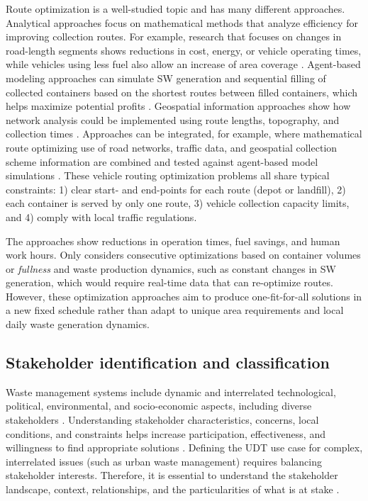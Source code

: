 \documentclass[authoryear,preprint,review,doubleblind, 12pt]{elsarticle}
\begin{document}
 Route optimization is a well-studied topic and has many different approaches. Analytical approaches focus on mathematical methods that analyze efficiency for improving collection routes. For example, research that focuses on changes in road-length segments shows reductions in cost, energy, or vehicle operating times, while vehicles using less fuel also allow an increase of area coverage \citep{erdincRouteOptimizationElectric2019, Hannan2018, Sahib2021}. Agent-based modeling approaches can simulate SW generation and sequential filling of collected containers based on the shortest routes between filled containers, which helps maximize potential profits \citep{Likotiko2017}. Geospatial information approaches show how network analysis could be implemented using route lengths, topography, and collection times \citep{Hemidat2017, Jovicic2010, Malakahmad2014}. Approaches can be integrated, for example, where mathematical route optimizing use of road networks, traffic data, and geospatial collection scheme information are combined and tested against agent-based model simulations \citep{nguyen-trongOptimizationMunicipalSolid2017}. These vehicle routing optimization problems all share typical constraints: 1) clear start- and end-points for each route (depot or landfill), 2) each container is served by only one route, 3) vehicle collection capacity limits, and 4)  comply with local traffic regulations.

    The approaches show reductions in operation times, fuel savings, and human work hours. Only \citet{Likotiko2017} considers consecutive optimizations based on container volumes or \textit{fullness} and waste production dynamics, such as constant changes in SW generation, which would require real-time data that can re-optimize routes. However, these optimization approaches aim to produce one-fit-for-all solutions in a new fixed schedule rather than adapt to unique area requirements and local daily waste generation dynamics.

    \subsection{Stakeholder identification and classification}
    \label{subsubsec:stakeholders}
    Waste management systems include dynamic and interrelated technological, political, environmental, and socio-economic aspects, including diverse stakeholders \citep{Zaman2011}. Understanding stakeholder characteristics, concerns, local conditions, and constraints helps increase participation, effectiveness, and willingness to find appropriate solutions \citep{Lishan2021, palacios-agundezIntegratingStakeholdersDemands2014}. Defining the UDT use case for complex, interrelated issues (such as urban waste management) requires balancing stakeholder interests. Therefore, it is essential to understand the stakeholder landscape, context, relationships, and the particularities of what is at stake \citep{Freeman2010}.
\end{document}

